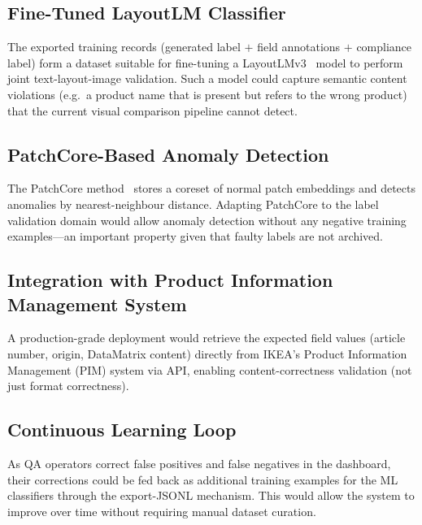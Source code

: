 \subsection{Fine-Tuned LayoutLM Classifier}

The exported training records (generated label $+$ field annotations $+$ compliance
label) form a dataset suitable for fine-tuning a LayoutLMv3~\cite{huang2022layoutlmv3}
model to perform joint text-layout-image validation. Such a model could capture
semantic content violations (e.g.\ a product name that is present but refers to the
wrong product) that the current visual comparison pipeline cannot detect.

\subsection{PatchCore-Based Anomaly Detection}

The PatchCore method~\cite{roth2022patchcore} stores a coreset of normal patch
embeddings and detects anomalies by nearest-neighbour distance. Adapting PatchCore
to the label validation domain would allow anomaly detection without any negative
training examples—an important property given that faulty labels are not archived.

\subsection{Integration with Product Information Management System}

A production-grade deployment would retrieve the expected field values (article number,
origin, DataMatrix content) directly from IKEA's Product Information Management (PIM)
system via API, enabling content-correctness validation (not just format correctness).

\subsection{Continuous Learning Loop}

As QA operators correct false positives and false negatives in the dashboard, their
corrections could be fed back as additional training examples for the ML classifiers
through the export-JSONL mechanism. This would allow the system to improve over time
without requiring manual dataset curation.
